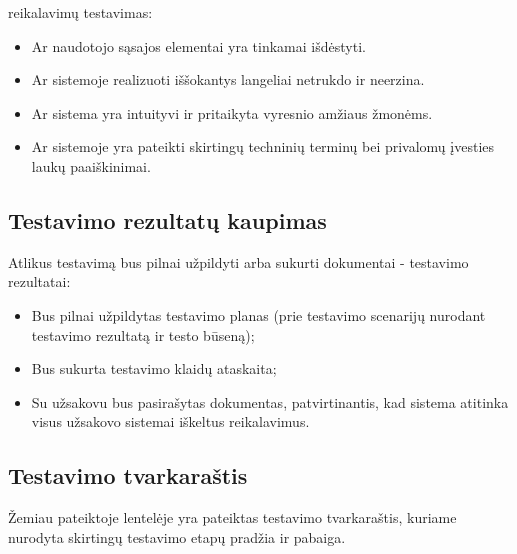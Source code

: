 \documentclass[12pt]{article}
\begin{document}
\begin{itemize}
{    reikalavimų testavimas}:
    \begin{itemize}[label=$\circ$]
        \item Ar naudotojo sąsajos elementai yra tinkamai išdėstyti.
        \item Ar sistemoje realizuoti iššokantys langeliai netrukdo ir neerzina.
        \item Ar sistema yra intuityvi ir pritaikyta vyresnio amžiaus žmonėms.
        \item Ar sistemoje yra pateikti skirtingų techninių terminų bei
        privalomų įvesties laukų paaiškinimai.
    \end{itemize}
\end{itemize}

\subsection{Testavimo rezultatų kaupimas}
Atlikus testavimą bus pilnai užpildyti arba sukurti dokumentai - testavimo
rezultatai:

\begin{itemize}
    \item Bus pilnai užpildytas testavimo planas (prie testavimo scenarijų
    nurodant testavimo rezultatą ir testo būseną);
    \item Bus sukurta testavimo klaidų ataskaita;
    \item Su užsakovu bus pasirašytas dokumentas, patvirtinantis, kad sistema
    atitinka visus užsakovo sistemai iškeltus reikalavimus.
\end{itemize}

\newpage

\subsection{Testavimo tvarkaraštis}
Žemiau pateiktoje lentelėje yra pateiktas testavimo tvarkaraštis, kuriame
nurodyta skirtingų testavimo etapų pradžia ir pabaiga.
\end{document}
